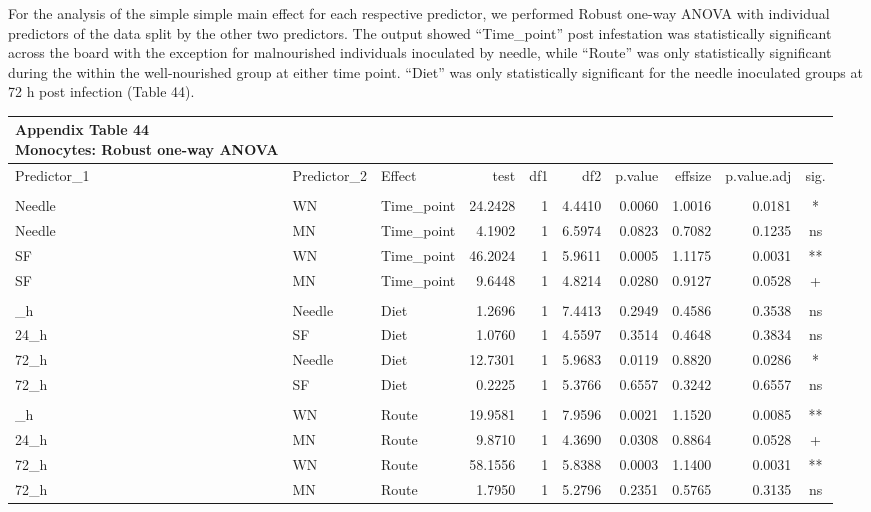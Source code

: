 \documentclass[
  12pt,
  letterpaper,
]{article}
\begin{document}
For the analysis of the simple simple main effect for each respective predictor, we performed Robust one-way ANOVA with individual predictors of the data split by the other two predictors. The output showed ``Time\_point'' post infestation was statistically significant across the board with the exception for malnourished individuals inoculated by needle, while ``Route'' was only statistically significant during the within the well-nourished group at either time point. ``Diet'' was only statistically significant for the needle inoculated groups at 72 h post infection (Table 44).

\begin{longtable}{lllrrrrrrc}
\caption*{
{\large \textbf{Appendix Table 44}} \\ 
{\small \textbf{Monocytes: Robust one-way ANOVA}}
} \\ 
\toprule
Predictor\_1 & Predictor\_2 & Effect & test & df1 & df2 & p.value & effsize & p.value.adj & sig. \\ 
\midrule\addlinespace[2.5pt]
\multicolumn{10}{l}{Predictor: Time\_point} \\ 
\midrule\addlinespace[2.5pt]
Needle & WN & Time\_point & 24.2428 & 1 & 4.4410 & 0.0060 & 1.0016 & 0.0181 & * \\ 
Needle & MN & Time\_point & 4.1902 & 1 & 6.5974 & 0.0823 & 0.7082 & 0.1235 & ns \\ 
SF & WN & Time\_point & 46.2024 & 1 & 5.9611 & 0.0005 & 1.1175 & 0.0031 & ** \\ 
SF & MN & Time\_point & 9.6448 & 1 & 4.8214 & 0.0280 & 0.9127 & 0.0528 & + \\ 
\midrule\addlinespace[2.5pt]
\multicolumn{10}{l}{Predictor: Diet} \\ 
\midrule\addlinespace[2.5pt]
24\_h & Needle & Diet & 1.2696 & 1 & 7.4413 & 0.2949 & 0.4586 & 0.3538 & ns \\ 
24\_h & SF & Diet & 1.0760 & 1 & 4.5597 & 0.3514 & 0.4648 & 0.3834 & ns \\ 
72\_h & Needle & Diet & 12.7301 & 1 & 5.9683 & 0.0119 & 0.8820 & 0.0286 & * \\ 
72\_h & SF & Diet & 0.2225 & 1 & 5.3766 & 0.6557 & 0.3242 & 0.6557 & ns \\ 
\midrule\addlinespace[2.5pt]
\multicolumn{10}{l}{Predictor: Route} \\ 
\midrule\addlinespace[2.5pt]
24\_h & WN & Route & 19.9581 & 1 & 7.9596 & 0.0021 & 1.1520 & 0.0085 & ** \\ 
24\_h & MN & Route & 9.8710 & 1 & 4.3690 & 0.0308 & 0.8864 & 0.0528 & + \\ 
72\_h & WN & Route & 58.1556 & 1 & 5.8388 & 0.0003 & 1.1400 & 0.0031 & ** \\ 
72\_h & MN & Route & 1.7950 & 1 & 5.2796 & 0.2351 & 0.5765 & 0.3135 & ns \\ 
\bottomrule
\end{longtable}
\end{document}
